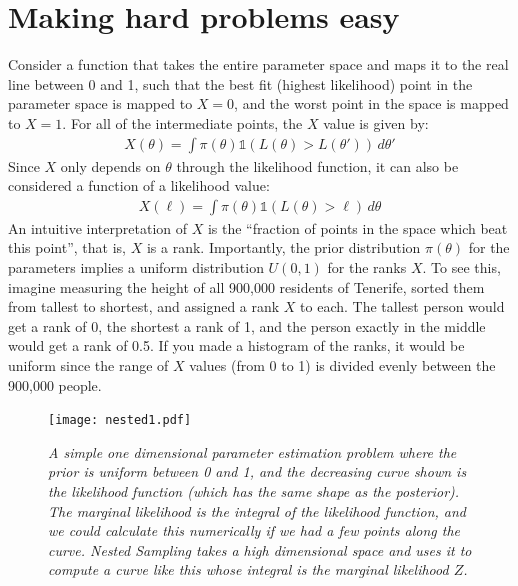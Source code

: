 \section{Making hard problems easy}
Consider a function that takes the entire parameter space and maps it to the
real line between 0 and 1, such that the best fit (highest likelihood) point in the
parameter space is mapped to $X=0$,
and the worst point in the space is mapped to $X=1$.
For all of the intermediate points, the $X$ value is given by:
\begin{eqnarray}
X(\theta) = \int \pi(\theta) \mathds{1}\left(L(\theta) > L(\theta')\right)\, d\theta'
\end{eqnarray}
Since $X$ only depends on $\theta$ through the likelihood function,
it can also be considered a function of a likelihood value:
\begin{eqnarray}
X(\ell) = \int \pi(\theta) \mathds{1}\left(L(\theta) > \ell\right)\, d\theta
\end{eqnarray}
An intuitive interpretation of $X$ is the ``fraction of points in the space
which beat this point'', that is, $X$ is a rank. Importantly, the prior
distribution $\pi(\theta)$ for the parameters implies a uniform distribution
$U(0, 1)$ for the ranks $X$. To see this, imagine measuring the height of all
900,000 residents of Tenerife, sorted them from tallest to shortest,
and assigned a rank $X$ to each. The tallest
person would get a rank of 0, the shortest a rank of 1, and the person exactly
in the middle would get a rank of 0.5. If you made a histogram of the ranks, it
would be uniform since the range of $X$ values (from 0 to 1) is divided evenly between the 900,000 people.

\begin{figure}
\begin{center}
\texttt{[image: nested1.pdf]}
\caption{\it A simple one dimensional parameter estimation problem where the
prior is uniform between 0 and 1, and the decreasing curve shown is the likelihood
function (which has the same shape as the posterior). The marginal likelihood
is the integral of the likelihood function, and we could calculate this
numerically if we had a few points along the curve. Nested Sampling takes a
high dimensional space and uses it to compute a curve like this whose integral
is the marginal likelihood $Z$.
\label{fig:nested1}}
\end{center}
\end{figure}

